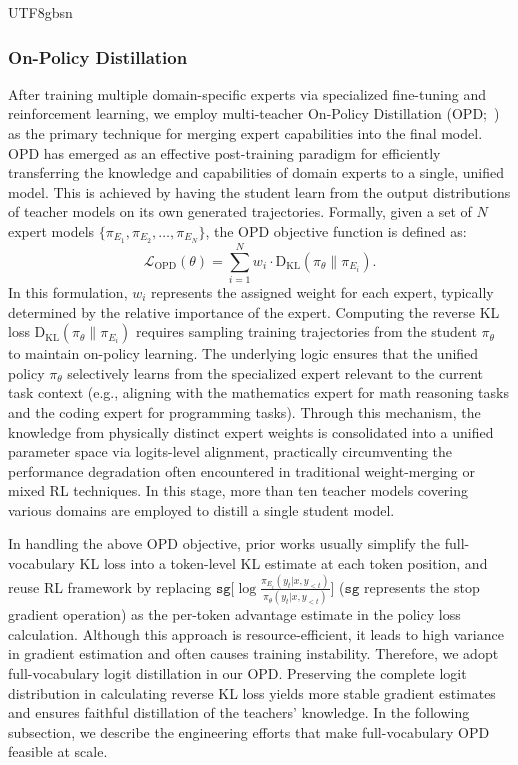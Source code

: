 \documentclass[11pt, a4paper, logo, copyright, nonumbering]{deepseek}
\begin{document}
\begin{CJK*}{UTF8}{gbsn}
\subsubsection{On-Policy Distillation}

After training multiple domain-specific experts via specialized fine-tuning and reinforcement learning, we employ multi-teacher On-Policy Distillation (OPD;~\citealt{lu2025onpolicydistillation,minillm}) as the primary technique for merging expert capabilities into the final model. 
OPD has emerged as an effective post-training paradigm for efficiently transferring the knowledge and capabilities of domain experts to a single, unified model. 
This is achieved by having the student learn from the output distributions of teacher models on its own generated trajectories. 
Formally, given a set of $N$ expert models $\{\pi_{E_1}, \pi_{E_2}, \dots, \pi_{E_N}\}$, the OPD objective function is defined as:
\begin{equation}
    \mathcal{L}_{\text{OPD}}(\theta) = \sum_{i=1}^{N} w_i \cdot \text{D}_{\text{KL}} \left( \pi_{\theta}   \parallel \pi_{E_i}  \right).
\end{equation}
In this formulation, $w_i$ represents the assigned weight for each expert, typically determined by the relative importance of the expert.
Computing the reverse KL loss $\text{D}_{\text{KL}} \left( \pi_{\theta}   \parallel \pi_{E_i}  \right)$ requires sampling training trajectories from the student $\pi_\theta$ to maintain on-policy learning. 
The underlying logic ensures that the unified policy $\pi_{\theta}$ selectively learns from the specialized expert relevant to the current task context (e.g., aligning with the mathematics expert for math reasoning tasks and the coding expert for programming tasks). 
Through this mechanism, the knowledge from physically distinct expert weights is consolidated into a unified parameter space via logits-level alignment, practically circumventing the performance degradation often encountered in traditional weight-merging or mixed RL techniques. 
In this stage, more than ten teacher models covering various domains are employed to distill a single student model.

In handling the above OPD objective, prior works usually simplify the full-vocabulary KL loss into a token-level KL estimate at each token position, and reuse RL framework by replacing $\texttt{sg}\big[\log \frac{\pi_{E_i}(y_{t}|x,y_{<t})}{\pi_{\theta}(y_{t}|x,y_{<t})}\big]$ ($\texttt{sg}$ represents the stop gradient operation) as the per-token advantage estimate in the policy loss calculation. 
Although this approach is resource-efficient, it leads to high variance in gradient estimation and often causes training instability. 
Therefore, we adopt full-vocabulary logit distillation in our OPD. 
Preserving the complete logit distribution in calculating reverse KL loss yields more stable gradient estimates and ensures faithful distillation of the teachers' knowledge. 
In the following subsection, we describe the engineering efforts that make full-vocabulary OPD feasible at scale.


\end{CJK*}
\end{document}
